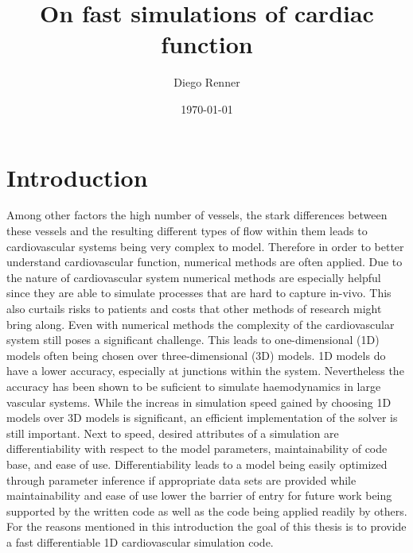\documentclass[a4paper, oneside]{discothesis}
\title{On fast simulations of cardiac function}
\author{Diego Renner}
\institute{Dep. of Mathematics \\[2pt]
ETH Zürich}
\date{\today}
\begin{document}
\frontmatter %
\maketitle
\cleardoublepage

\begin{acknowledgements}
	
\end{acknowledgements}


\begin{abstract}
	
\end{abstract}

\tableofcontents

\mainmatter %

\chapter{Introduction}
Among other factors the high number of vessels, the stark differences between these vessels and the resulting different types of flow within them leads to cardiovascular systems being very complex to model.
Therefore in order to better understand cardiovascular function, numerical methods are often applied.
Due to the nature of cardiovascular system numerical methods are especially helpful since they are able to simulate processes that are hard to capture in-vivo.
This also curtails risks to patients and costs that other methods of research might bring along.
Even with numerical methods the complexity of the cardiovascular system still poses a significant challenge.
This leads to one-dimensional (1D) models often being chosen over three-dimensional (3D) models. 
1D models do have a lower accuracy, especially at junctions within the system.
Nevertheless the accuracy has been shown to be suficient to simulate haemodynamics in large vascular systems.
While the increas in simulation speed gained by choosing 1D models over 3D models is significant, an efficient implementation of the solver is still important.
Next to speed, desired attributes of a simulation are differentiability with respect to the model parameters, maintainability of code base, and ease of use.
Differentiability leads to a model being easily optimized through parameter inference if appropriate data sets are provided while maintainability and ease of use lower the barrier of entry for future work being supported by the written code as well as the code being applied readily by others.
For the reasons mentioned in this introduction the goal of this thesis is to provide a fast differentiable 1D cardiovascular simulation code.
\end{document}
